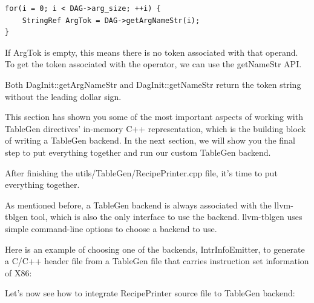 \begin{lstlisting}[style=styleCXX]
for(i = 0; i < DAG->arg_size; ++i) {
	StringRef ArgTok = DAG->getArgNameStr(i);
}
\end{lstlisting}

If ArgTok is empty, this means there is no token associated with that operand. To get the token associated with the operator, we can use the getNameStr API.

\begin{tcolorbox}[colback=blue!5!white,colframe=blue!75!black, fonttitle=\bfseries,title=Note]
\hspace*{0.7cm}Both DagInit::getArgNameStr and DagInit::getNameStr return the token string without the leading dollar sign.
\end{tcolorbox}

This section has shown you some of the most important aspects of working with TableGen directives' in-memory C++ representation, which is the building block of writing a TableGen backend. In the next section, we will show you the final step to put everything together and run our custom TableGen backend.


After finishing the utils/TableGen/RecipePrinter.cpp file, it's time to put everything together.

As mentioned before, a TableGen backend is always associated with the llvm-tblgen tool, which is also the only interface to use the backend. llvm-tblgen uses simple command-line options to choose a backend to use.

Here is an example of choosing one of the backends, IntrInfoEmitter, to generate a C/C++ header file from a TableGen file  that carries instruction set information of X86:


Let's now see how to integrate RecipePrinter source file to TableGen backend:

